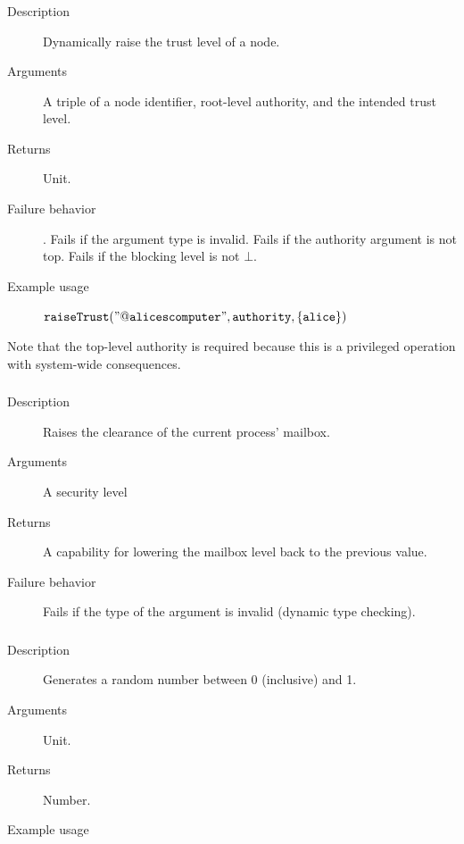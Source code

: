 \subsubsection{}
\begin{description}
    \item [Description] Dynamically raise the trust level of a node.
    \item [Arguments] A triple of a node identifier, root-level authority, and the intended trust level.
    \item [Returns] Unit.
    \item [Failure behavior]. Fails if the argument type is invalid. Fails if the authority argument is not top.
 Fails if the blocking level is not $\bot$.
    \item [Example usage] ${\mathtt{raiseTrust("@alicescomputer", authority, \{alice\})}}$
\end{description}
Note that the top-level authority is required because this is a privileged operation with system-wide consequences. 




\subsubsection{}
\begin{description}
    \item [Description] Raises the clearance of the current process' mailbox. 
    \item [Arguments] A security level
    \item [Returns] A capability for lowering the mailbox level back to the previous value. 
    \item [Failure behavior] Fails if the type of the argument is invalid (dynamic type checking).
\end{description}


\subsubsection{}
\begin{description}
    \item [Description] Generates a random number between 0 (inclusive) and 1.
    \item [Arguments] Unit.
    \item [Returns] Number.
    \item [Example usage] 
\end{description}






